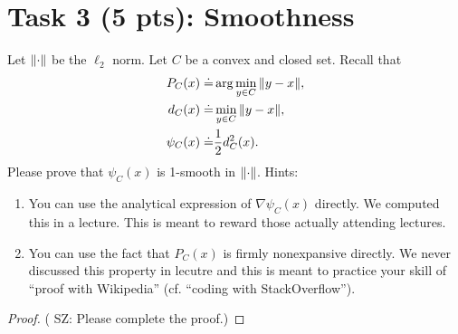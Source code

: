 \documentclass[11pt]{article}
\newcommand{\sz}[1]{({\color{blue} {SZ: #1}})}
\begin{document}
\section*{Task 3 (5 pts): Smoothness}
Let $\norm{\cdot}$ be the $\ell_2$ norm.
Let $C$ be a convex and closed set.
Recall that
\begin{align}
  P_C(x) \doteq& \arg\min_{y\in C} \norm{y - x}, \\ 
  d_C(x) \doteq& \min_{y \in C} \norm{y - x}, \\
  \psi_C(x) \doteq& \frac{1}{2} d_C^2(x).
\end{align}
Please prove that $\psi_C(x)$ is 1-smooth in $\norm{\cdot}$.
Hints:
\begin{enumerate}
  \item You can use the analytical expression of $\nabla \psi_C(x)$ directly. We computed this in a lecture. This is meant to reward those actually attending lectures.
  \item You can use the fact that $P_C(x)$ is firmly nonexpansive directly. We never discussed this property in lecutre and this is meant to practice your skill of ``proof with Wikipedia'' (cf. ``coding with StackOverflow'').
\end{enumerate}
\begin{proof}
  \sz{Please complete the proof.}
\end{proof}
\end{document}
